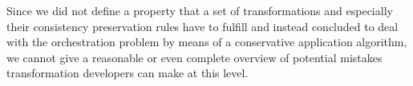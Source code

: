 Since we did not define a property that a set of transformations and especially their consistency preservation rules have to fulfill and instead concluded to deal with the orchestration problem by means of a conservative application algorithm, we cannot give a reasonable or even complete overview of potential mistakes transformation developers can make at this level.


%     

